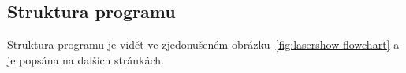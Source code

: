 
\subsection{Struktura programu}
Struktura programu je vidět ve zjedonušeném obrázku~\ref{fig:lasershow-flowchart} a je popsána na dalších stránkách.


